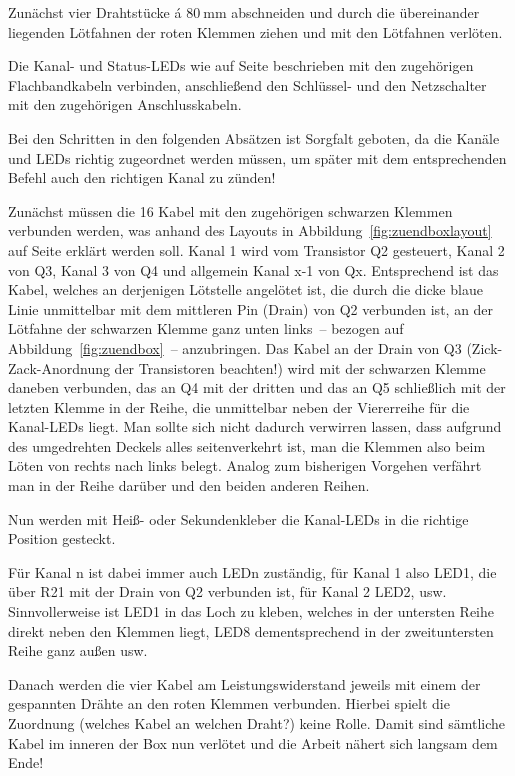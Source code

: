 \documentclass[paper=a4, parskip, numbers=noenddot, toc=listof, headsepline]{scrbook}
\begin{document}
					Zunächst vier Drahtstücke á $\SI{80}{\milli\metre}$ abschneiden und durch die übereinander liegenden Lötfahnen der roten Klemmen ziehen und mit den Lötfahnen verlöten.

					Die Kanal- und Status-LEDs wie auf Seite \pageref{enum:leds} beschrieben mit den zugehörigen Flachbandkabeln verbinden, anschließend den Schlüssel- und den Netzschalter mit den zugehörigen Anschlusskabeln.

					Bei den Schritten in den folgenden Absätzen ist Sorgfalt geboten, da die Kanäle und LEDs richtig zugeordnet werden müssen, um später mit dem entsprechenden Befehl auch den richtigen Kanal zu zünden!

					Zunächst müssen die 16 Kabel mit den zugehörigen schwarzen Klemmen verbunden werden, was anhand des Layouts in Abbildung~\ref{fig:zuendboxlayout} auf Seite \pageref{fig:zuendboxlayout} erklärt werden soll. Kanal 1 wird vom Transistor Q2 gesteuert, Kanal 2 von Q3, Kanal 3 von Q4 und allgemein Kanal x-1 von Qx. Entsprechend ist das Kabel, welches an derjenigen Lötstelle angelötet ist, die durch die dicke blaue Linie unmittelbar mit dem mittleren Pin (Drain) von Q2 verbunden ist, an der Lötfahne der schwarzen Klemme ganz unten links~-- bezogen auf Abbildung~\ref{fig:zuendbox}~-- anzubringen. Das Kabel an der Drain von Q3 (Zick-Zack-Anordnung der Transistoren beachten!) wird mit der schwarzen Klemme daneben verbunden, das an Q4 mit der dritten und das an Q5 schließlich mit der letzten Klemme in der Reihe, die unmittelbar neben der Viererreihe für die Kanal-LEDs liegt. Man sollte sich nicht dadurch verwirren lassen, dass aufgrund des umgedrehten Deckels alles seitenverkehrt ist, man die Klemmen also beim Löten von rechts nach links belegt. Analog zum bisherigen Vorgehen verfährt man in der Reihe darüber und den beiden anderen Reihen.

					Nun werden mit Heiß- oder Sekundenkleber die Kanal-LEDs in die richtige Position gesteckt.

					Für Kanal n ist dabei immer auch LEDn zuständig, für Kanal 1 also LED1, die über R21 mit der Drain von Q2 verbunden ist, für Kanal 2 LED2, usw. Sinnvollerweise ist LED1 in das Loch zu kleben, welches in der untersten Reihe direkt neben den Klemmen liegt, LED8 dementsprechend in der zweituntersten Reihe ganz außen usw.

					Danach werden die vier Kabel am Leistungswiderstand jeweils mit einem der gespannten Drähte an den roten Klemmen verbunden. Hierbei spielt die Zuordnung (welches Kabel an welchen Draht?) keine Rolle. Damit sind sämtliche Kabel im inneren der Box nun verlötet und die Arbeit nähert sich langsam dem Ende!
\end{document}
